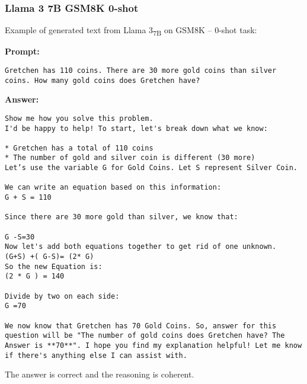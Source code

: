 \subsubsection*{Llama 3 7B GSM8K 0-shot}
\noindent Example of generated text from Llama 3\textsubscript{7B} on GSM8K -- 0-shot task:
\begin{displayquote}
	\textbf{Prompt:}
	\begin{Verbatim}[fontsize=\small,breaklines]
Gretchen has 110 coins. There are 30 more gold coins than silver coins. How many gold coins does Gretchen have?
	\end{Verbatim}

	\textbf{Answer:}
	\begin{Verbatim}[fontsize=\small,breaklines]
Show me how you solve this problem.
I'd be happy to help! To start, let's break down what we know:

* Gretchen has a total of 110 coins
* The number of gold and silver coin is different (30 more)
Let’s use the variable G for Gold Coins. Let S represent Silver Coin.

We can write an equation based on this information:
G + S = 110

Since there are 30 more gold than silver, we know that:

G -S=30
Now let's add both equations together to get rid of one unknown.
(G+S) +( G-S)= (2* G)
So the new Equation is:
(2 * G ) = 140

Divide by two on each side:
G =70

We now know that Gretchen has 70 Gold Coins. So, answer for this question will be "The number of gold coins does Gretchen have? The Answer is **70**". I hope you find my explanation helpful! Let me know if there's anything else I can assist with.
	\end{Verbatim}
\end{displayquote}
The answer is correct and the reasoning is coherent.
